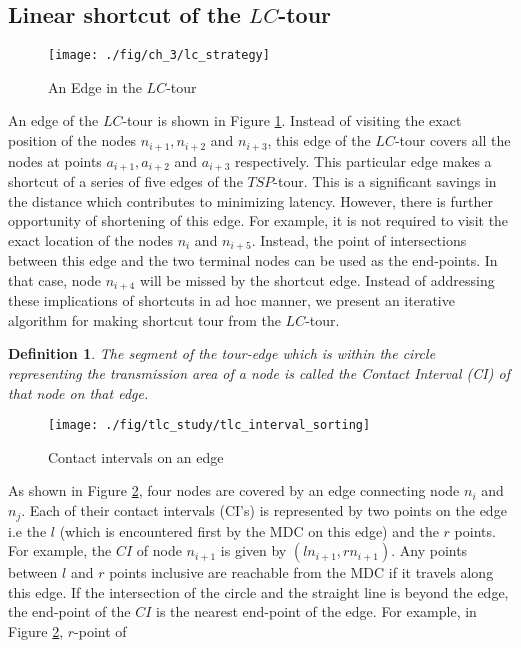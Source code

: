 \documentclass{llncs}
\newtheorem{mydef}{Definition}%
\begin{document}
\subsection{Linear shortcut of the $LC$-tour}
\begin{figure}[h!]
  \centering
    \texttt{[image: ./fig/ch\_3/lc\_strategy]} 
     \caption{An Edge in the $LC$-tour}
     \label{fig:lc_strategy}   
\end{figure}
An edge of the $LC$-tour is shown in Figure \ref{fig:lc_strategy}. Instead of visiting the exact
position of the nodes $n_{i+1},n_{i+2}$ and $n_{i+3}$, this edge of the $LC$-tour covers all the
nodes at points $a_{i+1},a_{i+2}$ and $a_{i+3}$ respectively. This particular edge makes a shortcut
of a series of five edges of the $TSP$-tour. This is a significant savings in the distance which
contributes to minimizing latency. However, there is further opportunity of shortening of this edge.
For example, it is not required to visit the exact location of the nodes $n_i$ and $n_{i+5}$.
Instead, the point of intersections between this edge and the two terminal nodes can be used as the
end-points. In that case, node $n_{i+4}$ will be missed by the shortcut edge. Instead of addressing
these implications of shortcuts in ad hoc manner, we present an iterative algorithm for making
shortcut tour from the $LC$-tour. 
\begin{mydef}
	The segment of the tour-edge which is within the circle representing the transmission area of a
	node is called the Contact Interval (CI) of that node on that edge.
\end{mydef}
\begin{figure}[h!] 
  \centering   
    \texttt{[image: ./fig/tlc\_study/tlc\_interval\_sorting]} 
     \caption{Contact intervals on an edge} 
     \label{fig:tlc_interval_sorting}  
\end{figure}
As shown in Figure \ref{fig:tlc_interval_sorting}, four nodes are covered by an edge connecting node
$n_i$ and $n_j$. Each of their contact intervals (CI's) is represented by two points on the edge i.e
the $l$  (which is encountered first by the MDC on this edge) and the $r$ points. For example, the
$CI$ of node $n_{i+1}$ is given by $(ln_{i+1},rn_{i+1})$. Any points between $l$ and $r$
points inclusive are reachable from the MDC if it travels along this edge. If the intersection of
the circle and the straight line is beyond the edge, the end-point of the $CI$ is the
nearest end-point of the edge. For example, in Figure \ref{fig:tlc_interval_sorting}, $r$-point of
\end{document}
